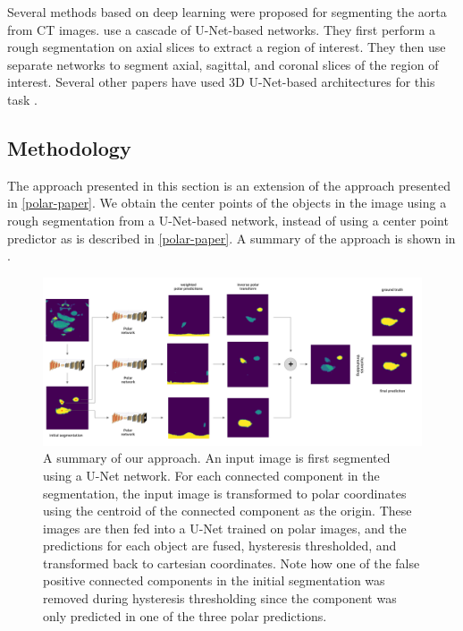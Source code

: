 Several methods based on deep learning were proposed for segmenting the aorta from CT images. \citet{fantazzini3DAutomaticSegmentation2020} use a cascade of U-Net-based networks. They first perform a rough segmentation on axial slices to extract a region of interest. They then use separate networks to segment axial, sagittal, and coronal slices of the region of interest. Several other papers have used 3D U-Net-based architectures for this task \cite{yuThreeDimensionalDeepConvolutional2021, chenMultistageLearningSegmentation2021}.

\subsection{Methodology}

The approach presented in this section is an extension of the approach presented in \ref{polar-paper}. We obtain the center points of the objects in the image using a rough segmentation from a U-Net-based network, instead of using a center point predictor as is described in \ref{polar-paper}. A summary of the approach is shown in .

\begin{figure}[h]
\centering
\includegraphics[width=\textwidth]{images/4/summary}
\caption{A summary of our approach. An input image is first segmented using a U-Net network. For each connected component in the segmentation, the input image is transformed to polar coordinates using the centroid of the connected component as the origin. These images are then fed into a U-Net trained on polar images, and the predictions for each object are fused, hysteresis thresholded, and transformed back to cartesian coordinates. Note how one of the false positive connected components in the initial segmentation was removed during hysteresis thresholding since the component was only predicted in one of the three polar predictions. \cite{bencevicUsingPolarTransform2022a}}
\label{fig:summary}
\end{figure}

